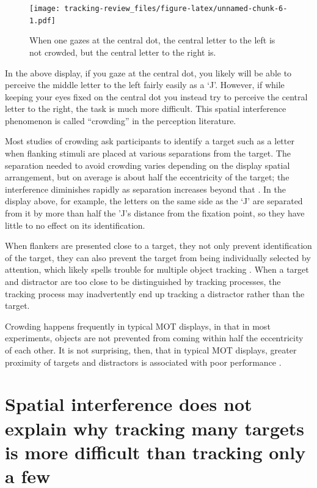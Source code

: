 \documentclass[
]{book}
\begin{document}
\begin{figure}
\centering
\texttt{[image: tracking-review\_files/figure-latex/unnamed-chunk-6-1.pdf]}
\caption{\label{fig:unnamed-chunk-6}When one gazes at the central dot, the central letter to the left is not crowded, but the central letter to the right is.}
\end{figure}

In the above display, if you gaze at the central dot, you likely will be able to perceive the middle letter to the left fairly easily as a `J'. However, if while keeping your eyes fixed on the central dot you instead try to perceive the central letter to the right, the task is much more difficult. This spatial interference phenomenon is called ``crowding'' in the perception literature.

Most studies of crowding ask participants to identify a target such as a letter when flanking stimuli are placed at various separations from the target. The separation needed to avoid crowding varies depending on the display spatial arrangement, but on average is about half the eccentricity of the target; the interference diminishes rapidly as separation increases beyond that \citep{boumaInteractionEffectsParafoveal1970a, gurnseyCrowdingSizeEccentricity2011}. In the display above, for example, the letters on the same side as the `J' are separated from it by more than half the 'J's distance from the fixation point, so they have little to no effect on its identification.

When flankers are presented close to a target, they not only prevent identification of the target, they can also prevent the target from being individually selected by attention, which likely spells trouble for multiple object tracking \citep{intriligatorSpatialResolutionVisual2001}. When a target and distractor are too close to be distinguished by tracking processes, the tracking process may inadvertently end up tracking a distractor rather than the target.

Crowding happens frequently in typical MOT displays, in that in most experiments, objects are not prevented from coming within half the eccentricity of each other. It is not surprising, then, that in typical MOT displays,
greater proximity of targets and distractors is associated with poor performance \citep{shimSpatialSeparationTargets2008, tombuAttentionalCostsMultipleobject2008}.

\hypertarget{spatial-interference-does-not-explain-why-tracking-many-targets-is-more-difficult-than-tracking-only-a-few}{%
\section{Spatial interference does not explain why tracking many targets is more difficult than tracking only a few}\label{spatial-interference-does-not-explain-why-tracking-many-targets-is-more-difficult-than-tracking-only-a-few}}
\end{document}
